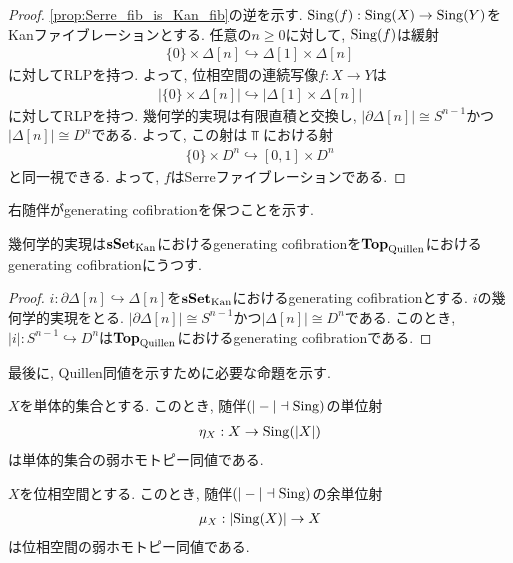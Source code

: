 \documentclass[uplatex, a4paper, 14Q, dvipdfmx]{jsarticle}
\begin{document}
\begin{proof}
  \cref{prop:Serre_fib_is_Kan_fib}の逆を示す. 
  $\mathrm{Sing}(f) : \mathrm{Sing}(X) \to \mathrm{Sing}(Y)$をKanファイブレーションとする. 
  任意の$n \geq 0$に対して, $\mathrm{Sing}(f)$は緩射
  \begin{align*}
    \{0\} \times \Delta[n] \hookrightarrow \Delta[1] \times \Delta[n]
  \end{align*}
  に対してRLPを持つ. 
  よって, 位相空間の連続写像$f : X \to Y$は
  \begin{align*}
    |\{0\} \times \Delta[n]| \hookrightarrow |\Delta[1] \times \Delta[n]|
  \end{align*}
  に対してRLPを持つ. 
  幾何学的実現は有限直積と交換し, $|\partial \Delta[n]| \cong S^{n-1}$かつ$|\Delta[n]| \cong D^n$である. 
  よって, この射は$\Top$における射
  \begin{align*}
    \{0\} \times D^n \hookrightarrow [0,1] \times D^n
  \end{align*}
  と同一視できる. 
  よって, $f$はSerreファイブレーションである.  
\end{proof}

右随伴がgenerating cofibrationを保つことを示す. 

\begin{lemma} \label{prop:geometric_realization_of_simplicial_set_is_CW_complex}
  幾何学的実現は$\mathbf{sSet}_\mathrm{Kan}$におけるgenerating cofibrationを$\mathbf{Top}_\mathrm{Quillen}$におけるgenerating cofibrationにうつす. 
\end{lemma}

\begin{proof}
  $i : \partial \Delta[n] \hookrightarrow \Delta[n]$を$\mathbf{sSet}_\mathrm{Kan}$におけるgenerating cofibrationとする. 
  $i$の幾何学的実現をとる. 
  $|\partial \Delta[n]| \cong S^{n-1}$かつ$|\Delta[n]| \cong D^n$である. 
  このとき, $|i| : S^{n-1} \hookrightarrow D^n$は$\mathbf{Top}_\mathrm{Quillen}$におけるgenerating cofibrationである.
\end{proof}

最後に, Quillen同値を示すために必要な命題を示す. 

\begin{lemma} \label{prop:X_to_Sing|X|}
  $X$を単体的集合とする. 
  このとき, 随伴$(|-| \dashv \mathrm{Sing})$の単位射
  \begin{align*}
    \eta_X : X \to \mathrm{Sing}(|X|)
  \end{align*}
  は単体的集合の弱ホモトピー同値である. 
\end{lemma}

\begin{corollary} \label{prop:|SingX|_to_X}
  $X$を位相空間とする. 
  このとき, 随伴$(|-| \dashv \mathrm{Sing})$の余単位射
  \begin{align*}
    \mu_X : |\mathrm{Sing}(X)| \to X 
  \end{align*}
  は位相空間の弱ホモトピー同値である. 
\end{corollary}
\end{document}
